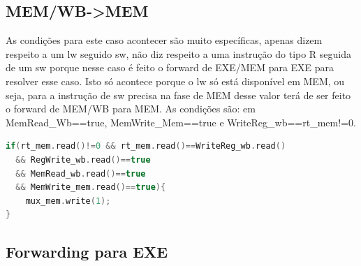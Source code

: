 \documentclass[pdftex,12pt,a4paper]{report}
\begin{document}
\subsection{MEM/WB->MEM}
\begin{table}[!htb]
\centering
\label{my-label}
\end{table}

As condições para este caso acontecer são muito específicas, apenas dizem respeito a um lw seguido sw, não diz respeito a uma instrução do tipo R seguida de um sw porque nesse caso é feito o forward de EXE/MEM para EXE para resolver esse caso. Isto só acontece porque o lw só está disponível em MEM, ou seja, para a instrução de sw precisa na fase de MEM desse valor terá de ser feito o forward de MEM/WB para MEM. 
As condições são: em MemRead{\_}Wb==true, MemWrite{\_}Mem==true e WriteReg{\_}wb==rt{\_}mem!=0.

\begin{lstlisting}[language=c]
if(rt_mem.read()!=0 && rt_mem.read()==WriteReg_wb.read() 
  && RegWrite_wb.read()==true 
  && MemRead_wb.read()==true
  && MemWrite_mem.read()==true){
    mux_mem.write(1);
}
\end{lstlisting} 

\subsection{Forwarding para EXE}
\end{document}
